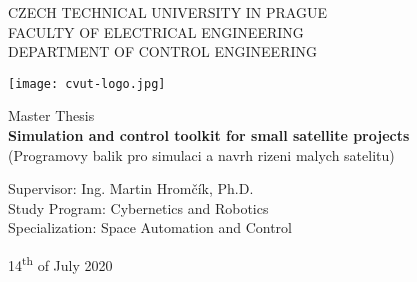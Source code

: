 \begin{titlepage}
    \centering

    {\Large CZECH TECHNICAL UNIVERSITY IN PRAGUE}\\[0.3cm]
    {\large FACULTY OF ELECTRICAL ENGINEERING}\\[0.3cm]
    {\large DEPARTMENT OF CONTROL ENGINEERING}\\

    \vfill

    \texttt{[image: cvut-logo.jpg]}\\

    \vfill

    {\Large Master Thesis}\\[0.3cm]
    {\huge \textbf{Simulation and control toolkit for small satellite projects}}\\[0.3cm]
    {\Large(Programovy balik pro simulaci a navrh rizeni malych satelitu)}\\

    \vfill

    Supervisor: Ing. Martin Hromčík, Ph.D.\\[0.6cm]  
    Study Program: Cybernetics and Robotics\\[0.2cm]  
    Specialization: Space Automation and Control\\

    \vfill

    14\textsuperscript{th} of July 2020
\end{titlepage}